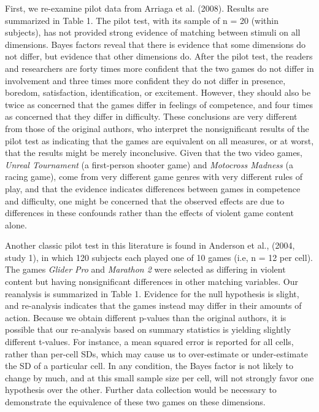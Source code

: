 \documentclass[fignum,nobf,man]{apa}
\begin{document}
First, we re-examine pilot data from Arriaga et al. (2008). Results are summarized in Table 1. The pilot test, with its sample of n = 20 (within subjects), has not provided strong evidence of matching between stimuli on all dimensions. Bayes factors reveal that there is evidence that some dimensions do not differ, but evidence that other dimensions do. After the pilot test, the readers and researchers are forty times more confident that the two games do not differ in involvement and three times more confident they do not differ in presence, boredom, satisfaction, identification, or excitement. However, they should also be twice as concerned that the games differ in feelings of competence, and four times as concerned that they differ in difficulty. These conclusions are very different from those of the original authors, who interpret the nonsignificant results of the pilot test as indicating that the games are equivalent on all measures, or at worst, that the results might be merely inconclusive. Given that the two video games, \textit{Unreal Tournament} (a first-person shooter game) and \textit{Motocross Madness} (a racing game), come from very different game genres with very different rules of play, and that the evidence indicates differences between games in competence and difficulty, one might be concerned that the observed effects are due to differences in these confounds rather than the effects of violent game content alone.

Another classic pilot test in this literature is found in Anderson et al., (2004, study 1), in which 120 subjects each played one of 10 games (i.e, n = 12 per cell). The games \textit{Glider Pro} and \textit{Marathon 2} were selected as differing in violent content but having nonsignificant differences in other matching variables. Our reanalysis is summarized in Table 1. Evidence for the null hypothesis is slight, and re-analysis indicates that the games instead may differ in their amounts of action. Because we obtain different p-values than the original authors, it is possible that our re-analysis based on summary statistics is yielding slightly different t-values. For instance, a mean squared error is reported for all cells, rather than per-cell SDs, which may cause us to over-estimate or under-estimate the SD of a particular cell. In any condition, the Bayes factor is not likely to change by much, and at this small sample size per cell, will not strongly favor one hypothesis over the other. Further data collection would be necessary to demonstrate the equivalence of these two games on these dimensions. 
\end{document}
